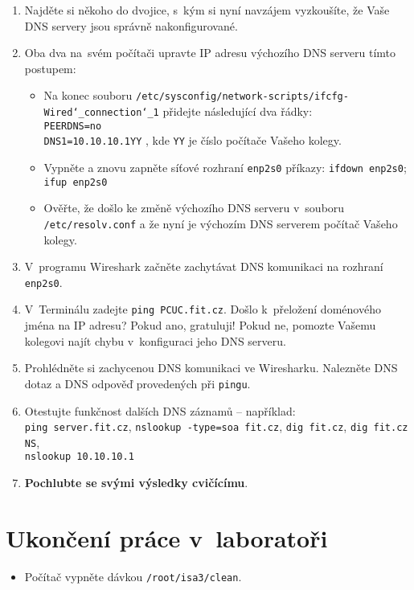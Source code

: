 \begin{enumerate}
  \item Najděte si někoho do dvojice, s~kým si nyní navzájem vyzkoušíte, že Vaše DNS servery jsou správně nakonfigurované.
  \item Oba dva na~svém počítači upravte IP adresu výchozího DNS serveru tímto postupem:
  \begin{itemize}
    \item Na konec souboru {\tt /etc/sysconfig/network-scripts/ifcfg-Wired\char`_connection\char`_1} přidejte následující dva řádky:\\
          \verb|PEERDNS=no|\\
          \verb|DNS1=10.10.10.1YY| , kde {\tt YY} je číslo počítače Vašeho kolegy.
    \item Vypněte a znovu zapněte síťové rozhraní {\tt enp2s0} příkazy: {\tt ifdown enp2s0}; {\tt ifup enp2s0}
    \item Ověřte, že došlo ke změně výchozího DNS serveru v~souboru {\tt /etc/resolv.conf} a že nyní je výchozím DNS serverem počítač Vašeho kolegy.
  \end{itemize}
  \item V~programu Wireshark začněte zachytávat DNS komunikaci na rozhraní {\tt enp2s0}.
  \item V~Terminálu zadejte {\tt ping PCUC.fit.cz}. Došlo k~přeložení doménového jména na IP adresu? Pokud ano, gratuluji! Pokud ne, pomozte Vašemu kolegovi najít chybu
    v~konfiguraci jeho DNS serveru.
  \item Prohlédněte si zachycenou DNS komunikaci ve Wiresharku. Nalezněte DNS dotaz a DNS odpověď provedených při {\tt pingu}.
  \item Otestujte funkčnost dalších DNS záznamů -- například:\\
        {\tt ping server.fit.cz}, {\tt nslookup -type=soa fit.cz}, {\tt dig fit.cz}, {\tt dig fit.cz NS},\\ {\tt nslookup 10.10.10.1}
  \item {\bf Pochlubte se svými výsledky cvičícímu}.
\end{enumerate}




\section{Ukončení práce v~laboratoři}
\begin{itemize}
  \item Počítač vypněte dávkou {\tt /root/isa3/clean}.
\end{itemize}

